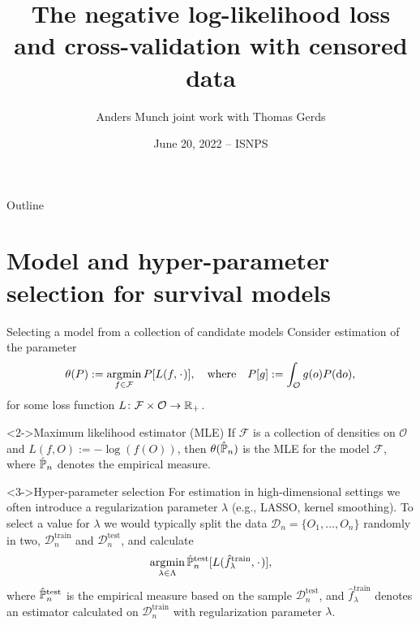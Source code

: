 \documentclass[smaller]{beamer}\usepackage{listings}
\institute{PhD Student, Section of Biostatistics \\ University of Copenhagen}
\author{Anders Munch \newline \small joint work with Thomas Gerds}
\date{June 20, 2022 -- ISNPS}
\title{The negative log-likelihood loss and cross-validation with censored data}
\begin{document}
\maketitle
\begin{frame}{Outline}
\tableofcontents
\end{frame}

\section{Model and hyper-parameter selection for survival models}
\label{sec:orgc1ccdab}
\begin{frame}[label={sec:org2832618}]{Selecting a model from a collection of candidate models}
\small Consider estimation of the parameter
\begin{equation*}
  \theta(P) := \argmin_{f \in\mathcal{F}} P[L(f, \blank)],
  \quad \text{where} \quad
  P[g] := \int_{\mathcal{O}}g(o) P(\diff o),
\end{equation*}
for some loss function $L \colon \mathcal{F} \times \mathcal{O} \rightarrow \mathbb{R}_+$.

\begin{exampleblock}<2->{\normalsize Maximum likelihood estimator (MLE)}
If \(\mathcal{F}\) is a collection of densities on \(\mathcal{O}\) and \(L(f, O) := -\log(f(O))\), then
\(\theta(\hat{\mathbb{P}}_n)\) is the MLE for the model \(\mathcal{F}\), where \(\hat{\mathbb{P}}_n\) denotes the empirical
measure.
\end{exampleblock}

\begin{exampleblock}<3->{\normalsize Hyper-parameter selection}
For estimation in high-dimensional settings we often introduce a regularization parameter $\lambda$
(e.g., LASSO, kernel smoothing). To select a value for $\lambda$ we would typically split the data
$\mathcal{D}_n = \{O_1, \dots, O_n\}$ randomly in two, $\mathcal{D}_n^{\mathrm{train}}$ and $\mathcal{D}_n^{\mathrm{test}}$, and
calculate
\begin{equation*}
\argmin_{\lambda\in\Lambda} \empmeas^{\mathrm{test}}[L(\hat{f}^{\mathrm{train}}_{\lambda}, \blank)],
\end{equation*}
where $\hat{\mathbb{P}}_n^{\mathrm{test}}$ is the empirical measure based on the sample $\mathcal{D}_n^{\mathrm{test}}$, and
$\hat{f}^{\mathrm{train}}_{\lambda}$ denotes an estimator calculated on $\mathcal{D}_n^{\mathrm{train}}$ with regularization
parameter $\lambda$.
\end{exampleblock}
\end{frame}
\end{document}
